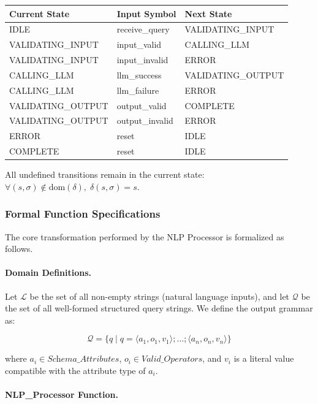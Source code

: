 \documentclass[12pt, titlepage]{article}
\begin{document}
\begin{center}
\begin{tabular}{l l l}
\toprule
\textbf{Current State} & \textbf{Input Symbol} & \textbf{Next State} \\
\midrule
IDLE & receive\_query & VALIDATING\_INPUT \\
VALIDATING\_INPUT & input\_valid & CALLING\_LLM \\
VALIDATING\_INPUT & input\_invalid & ERROR \\
CALLING\_LLM & llm\_success & VALIDATING\_OUTPUT \\
CALLING\_LLM & llm\_failure & ERROR \\
VALIDATING\_OUTPUT & output\_valid & COMPLETE \\
VALIDATING\_OUTPUT & output\_invalid & ERROR \\
ERROR & reset & IDLE \\
COMPLETE & reset & IDLE \\
\bottomrule
\end{tabular}
\end{center}

All undefined transitions remain in the current state: $\forall (s, \sigma) \notin \text{dom}(\delta), \; \delta(s, \sigma) = s$.

\subsubsection{Formal Function Specifications}

The core transformation performed by the NLP Processor is formalized as follows.

\paragraph{Domain Definitions.}

Let $\mathcal{L}$ be the set of all non-empty strings (natural language inputs), and let $\mathcal{Q}$ be the set of all well-formed structured query strings. We define the output grammar as:

\[
\mathcal{Q} = \{ q \mid q = \langle a_1, o_1, v_1 \rangle ; \ldots ; \langle a_n, o_n, v_n \rangle \}
\]

where $a_i \in \textit{Schema\_Attributes}$, $o_i \in \textit{Valid\_Operators}$, and $v_i$ is a literal value compatible with the attribute type of $a_i$.

\paragraph{NLP\_Processor Function.}
\end{document}

